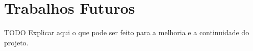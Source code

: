 \chapter{Trabalhos Futuros}
\label{cap:trabalhos_futuros}

TODO Explicar aqui o que pode ser feito para a melhoria e a continuidade do projeto.

